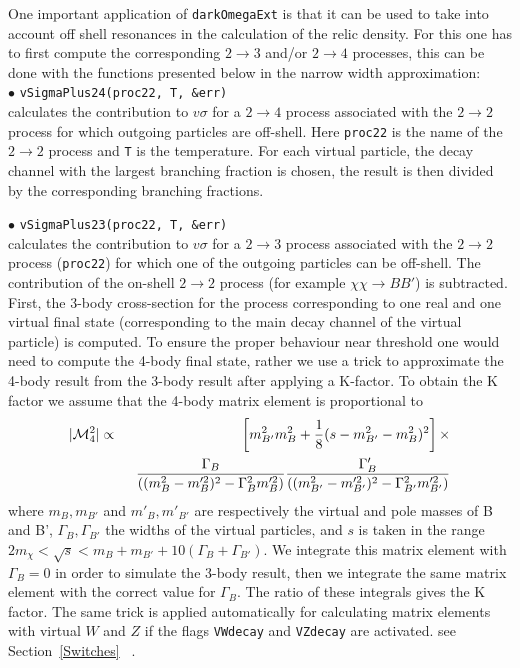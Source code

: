 \documentclass[12pt,a4paper]{article}
\begin{document}
One important application of   {\tt darkOmegaExt} is that it can be used to take into account off shell resonances in the calculation of the relic density.
For this one has to first compute the corresponding $2\to 3$ and/or $2\to 4$ processes, this can be done with the functions  presented below 
in the narrow width approximation:\\

\noindent
$\bullet$ \verb|vSigmaPlus24(proc22, T, &err)|\\
calculates the contribution to $v\sigma$ for a $2\to 4$ process  associated with the  $2\to2$ process  for which outgoing particles are off-shell. 
Here {\tt proc22} is the name of the $2\to2$ process and {\tt T} is the temperature.
For each virtual particle, the decay channel with the largest branching fraction is chosen, the result is then divided by the corresponding branching fractions.

\noindent
$\bullet$ \verb|vSigmaPlus23(proc22, T, &err)|\\
calculates the contribution to  $v\sigma$ for a $2\to 3$ process  associated with the  $2\to2$ process ({\tt proc22})  for which one of the outgoing particles can be off-shell.  The contribution of the on-shell $2\to2$ process (for example $\chi\chi\to B B'$) is subtracted.
First, the 3-body cross-section for the process  corresponding to one real and one virtual final state (corresponding to the main decay channel of the virtual particle) is computed. 
To ensure the proper behaviour near threshold one would need to compute the 4-body final state, rather we use a trick  to approximate the 4-body result from the 3-body result after applying a K-factor.
To obtain the K factor we assume that the 4-body matrix element is proportional to
\begin{eqnarray}
\label{ME_WW}
|{\cal M}_{4}^2|  \propto&&
\left[  m_{B'}^2 m_B^2 +\frac{1}{8}(s -m_{B'}^2 -m_{B}^2)^2\right] \times\\
&& \;\;\frac{\Gamma_B}{\left((m_B^2-m_B'^2)^2-\Gamma^2_B m_B'^2\right)}
\frac{\Gamma_B'}{\left((m_{B'}^2-m_{B'}'^2)^2-\Gamma^2_{B'} m_{B'}'^2\right)}
\end{eqnarray}
where $m_B, m_{B'}$ and $m'_{B}, m'_{B'}$ are respectively the virtual and pole masses of B and B', $\Gamma_B,\Gamma_{B'}$ the widths of the virtual particles,
and  $s$ is taken in the range $ 2 m_\chi < \sqrt{s} < m_B+m_{B'} + 10 (\Gamma_B+\Gamma_{B'}) $. 
 We integrate this matrix element
with $\Gamma_B=0$ in order to simulate the 3-body result, then we integrate the same matrix
element with the correct value for $\Gamma_B$. The ratio of these integrals gives the K factor. 
 The same trick is applied automatically  for calculating matrix elements with virtual $W$ and $Z$ 
 if the flags {\tt VWdecay} and {\tt VZdecay} are activated. see Section~\ref{Switches} ~\cite{Belanger:2013oya}.  
\end{document}

